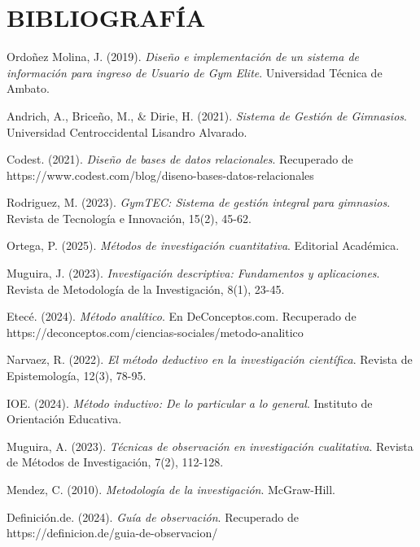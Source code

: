 \documentclass[12pt, letterpaper]{article}
\begin{document}
\section*{BIBLIOGRAFÍA}
\setcounter{section}{5}

\begin{thebibliography}{99}

Ordoñez Molina, J. (2019). \textit{Diseño e implementación de un sistema de información para ingreso de Usuario de Gym Elite}. Universidad Técnica de Ambato.

Andrich, A., Briceño, M., \& Dirie, H. (2021). \textit{Sistema de Gestión de Gimnasios}. Universidad Centroccidental Lisandro Alvarado.

Codest. (2021). \textit{Diseño de bases de datos relacionales}. Recuperado de https://www.codest.com/blog/diseno-bases-datos-relacionales

Rodriguez, M. (2023). \textit{GymTEC: Sistema de gestión integral para gimnasios}. Revista de Tecnología e Innovación, 15(2), 45-62.

Ortega, P. (2025). \textit{Métodos de investigación cuantitativa}. Editorial Académica.

Muguira, J. (2023). \textit{Investigación descriptiva: Fundamentos y aplicaciones}. Revista de Metodología de la Investigación, 8(1), 23-45.

Etecé. (2024). \textit{Método analítico}. En DeConceptos.com. Recuperado de https://deconceptos.com/ciencias-sociales/metodo-analitico

Narvaez, R. (2022). \textit{El método deductivo en la investigación científica}. Revista de Epistemología, 12(3), 78-95.

IOE. (2024). \textit{Método inductivo: De lo particular a lo general}. Instituto de Orientación Educativa.

Muguira, A. (2023). \textit{Técnicas de observación en investigación cualitativa}. Revista de Métodos de Investigación, 7(2), 112-128.

Mendez, C. (2010). \textit{Metodología de la investigación}. McGraw-Hill.

Definición.de. (2024). \textit{Guía de observación}. Recuperado de https://definicion.de/guia-de-observacion/


\end{thebibliography}
\end{document}
